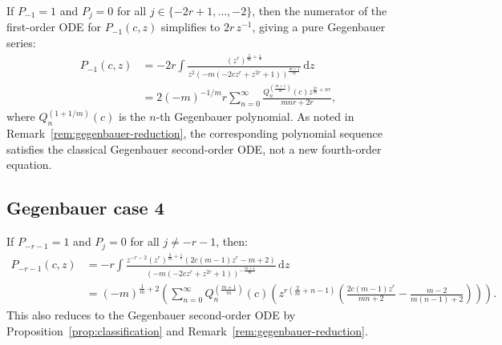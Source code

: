 \documentclass[final,nopreprintline]{elsarticle}
\theoremstyle{definition}
\numberwithin{equation}{section}
\theoremstyle{remark}
\begin{document}
If $P_{-1}=1$ and $P_j=0$ for all $j\in\{-2r+1,\ldots,-2\}$, then the numerator of the
first-order ODE for $P_{-1}(c,z)$ simplifies to $2r\,z^{-1}$, giving a pure Gegenbauer
series:
\begin{align*}
    P_{-1}(c,z)&=-2 r \int \frac{\left(z^r\right)^{\frac{2}{m}+\frac{1}{r}}}{z^2 \left(-m \left(-2 c z^r+z^{2 r}+1\right)\right)^{\frac{m+1}{m}}} \, \textrm{d}z \\
    &=2 (-m)^{-1/m} r \sum _{n=0}^{\infty } \frac{Q_n^{\left(\frac{m+1}{m}\right)}(c) z^{\frac{2 r}{m}+n r}}{m n r+2 r},
\end{align*}
where $Q_n^{(1+1/m)}(c)$ is the $n$-th Gegenbauer polynomial.
As noted in Remark~\ref{rem:gegenbauer-reduction}, the corresponding polynomial sequence
satisfies the classical Gegenbauer second-order ODE, not a new fourth-order equation.

\subsection{Gegenbauer case 4}

If $P_{-r-1}=1$ and $P_j=0$ for all $j\neq -r-1$, then:
\begin{align*}
    P_{-r-1}(c,z)&=-r \int \frac{z^{-r-2} \left(z^r\right)^{\frac{2}{m}+\frac{1}{r}} \left(2 c (m-1) z^r-m+2\right)}{\left(-m \left(-2 c z^r+z^{2 r}+1\right)\right)^{-\frac{m+1}{m}}} \, \textrm{d}z \\
    &=(-m)^{\frac{1}{m}+2} \left(\sum _{n=0}^{\infty } Q_n^{\left(\frac{m+1}{m}\right)}(c) \left(z^{r \left(\frac{2}{m}+n-1\right)} \left(\frac{2 c (m-1) z^r}{m n+2}-\frac{m-2}{m (n-1)+2}\right)\right)\right).
\end{align*}
This also reduces to the Gegenbauer second-order ODE by Proposition~\ref{prop:classification}
and Remark~\ref{rem:gegenbauer-reduction}.
\end{document}

